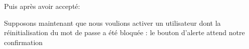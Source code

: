 \documentclass{article}
\begin{document}
\begin{enumerate}
               \noindent{}  
  
  \vspace{2cm}
  Puis après avoir accepté:
  
  \vspace{0.7cm}
               \hspace*{-0.7in}

               \noindent{}
  
  Supposons maintenant que nous voulions activer un utilisateur dont la réinitialisation du mot de passe a été bloquée :
  le bouton d'alerte attend notre confirmation
  \vspace{0.7cm}
               \hspace*{-0.7in}

               \noindent{}
  

\end{enumerate}
\end{document}
